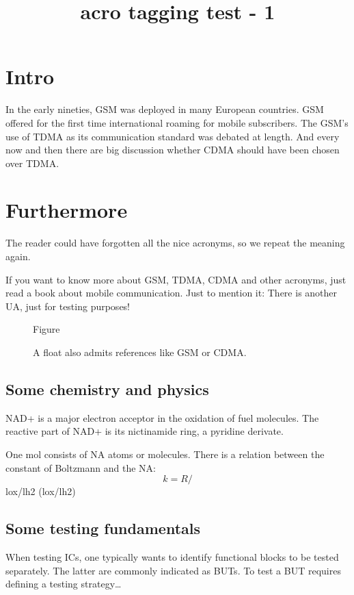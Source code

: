 \documentclass{article}
\title{acro tagging test - 1}
\begin{document}
\section{Intro}
In the early nineties, \acs{GSM} was deployed in many European
countries. \ac{GSM} offered for the first time international
roaming for mobile subscribers. The \acs{GSM}'s use of \ac{TDMA} as
its communication standard was debated at length. And every now
and then there are big discussion whether \ac{CDMA} should have
been chosen over \ac{TDMA}.

\section{Furthermore}
\acresetall
The reader could have forgotten all the nice acronyms, so we repeat the
meaning again.

If you want to know more about \acf{GSM}, \acf{TDMA}, \acf{CDMA}
and other acronyms, just read a book about mobile communication. Just
to mention it: There is another \ac{UA}, just for testing purposes!

\begin{figure}[h]
Figure
\caption{A float also admits references like \ac{GSM} or \acf{CDMA}.}
\end{figure}

\subsection{Some chemistry and physics}
\label{Chem}
\ac{NAD+} is a major electron acceptor in the oxidation
of fuel molecules. The reactive part of \ac{NAD+} is its nictinamide
ring, a pyridine derivate.

One mol consists of \acs{NA} atoms or molecules. There is a relation
between the constant of Boltzmann and the \acl{NA}:
\begin{equation}
  k = R/%
\end{equation}
\acl{lox}/\acl{lh2} (\acs{lox}/\acs{lh2})
\subsection{Some testing fundamentals}
When testing \acp{IC}, one typically wants to identify functional
blocks to be tested separately. The latter are commonly indicated as
\acp{BUT}. To test a \ac{BUT} requires defining a testing strategy\dots

\printacronyms
\end{document}
